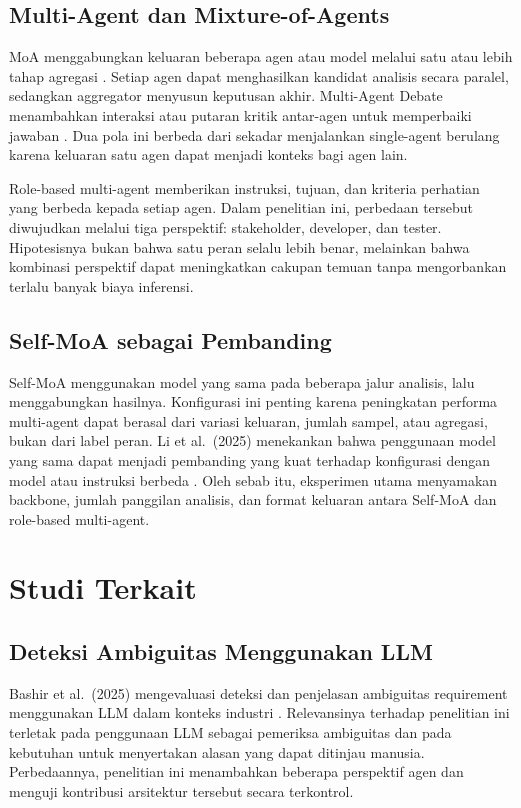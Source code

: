 \subsection{Multi-Agent dan Mixture-of-Agents}

MoA menggabungkan keluaran beberapa agen atau model melalui satu atau lebih tahap agregasi \cite{wang2024moa}. Setiap agen dapat menghasilkan kandidat analisis secara paralel, sedangkan aggregator menyusun keputusan akhir. Multi-Agent Debate menambahkan interaksi atau putaran kritik antar-agen untuk memperbaiki jawaban \cite{du2023}. Dua pola ini berbeda dari sekadar menjalankan single-agent berulang karena keluaran satu agen dapat menjadi konteks bagi agen lain.

Role-based multi-agent memberikan instruksi, tujuan, dan kriteria perhatian yang berbeda kepada setiap agen. Dalam penelitian ini, perbedaan tersebut diwujudkan melalui tiga perspektif: stakeholder, developer, dan tester. Hipotesisnya bukan bahwa satu peran selalu lebih benar, melainkan bahwa kombinasi perspektif dapat meningkatkan cakupan temuan tanpa mengorbankan terlalu banyak biaya inferensi.

\subsection{Self-MoA sebagai Pembanding}

Self-MoA menggunakan model yang sama pada beberapa jalur analisis, lalu menggabungkan hasilnya. Konfigurasi ini penting karena peningkatan performa multi-agent dapat berasal dari variasi keluaran, jumlah sampel, atau agregasi, bukan dari label peran. Li et al.\ (2025) menekankan bahwa penggunaan model yang sama dapat menjadi pembanding yang kuat terhadap konfigurasi dengan model atau instruksi berbeda \cite{lismoa2025}. Oleh sebab itu, eksperimen utama menyamakan backbone, jumlah panggilan analisis, dan format keluaran antara Self-MoA dan role-based multi-agent.

\section{Studi Terkait}

\subsection{Deteksi Ambiguitas Menggunakan LLM}

Bashir et al.\ (2025) mengevaluasi deteksi dan penjelasan ambiguitas requirement menggunakan LLM dalam konteks industri \cite{bashir2025}. Relevansinya terhadap penelitian ini terletak pada penggunaan LLM sebagai pemeriksa ambiguitas dan pada kebutuhan untuk menyertakan alasan yang dapat ditinjau manusia. Perbedaannya, penelitian ini menambahkan beberapa perspektif agen dan menguji kontribusi arsitektur tersebut secara terkontrol.

